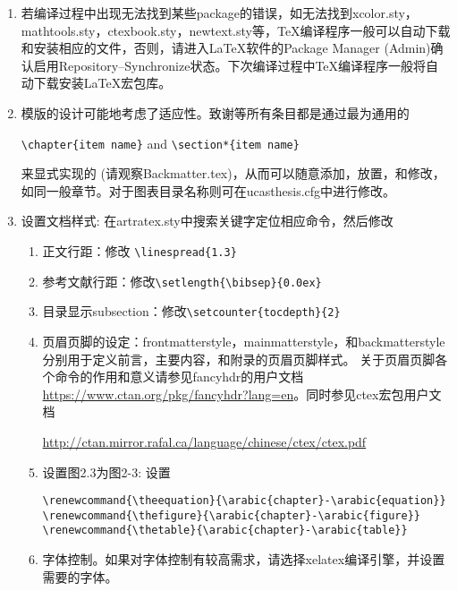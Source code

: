 \begin{enumerate}
    \item 若编译过程中出现无法找到某些package的错误，如无法找到xcolor.sty，mathtools.sty，ctexbook.sty，newtext.sty等，\TeX{}编译程序一般可以自动下载和安装相应的文件，否则，请进入\LaTeX{}软件的Package Manager (Admin)确认启用Repository--Synchronize状态。下次编译过程中\TeX{}编译程序一般将自动下载安装\LaTeX{}宏包库。
    \item 模版的设计可能地考虑了适应性。致谢等所有条目都是通过最为通用的

        \verb+\chapter{item name}+  and \verb+\section*{item name}+

        来显式实现的 (请观察Backmatter.tex)，从而可以随意添加，放置，和修改，如同一般章节。对于图表目录名称则可在ucasthesis.cfg中进行修改。

    \item 设置文档样式: 在artratex.sty中搜索关键字定位相应命令，然后修改
        \begin{enumerate}
            \item 正文行距：修改 \verb|\linespread{1.3}|
            \item 参考文献行距：修改\verb|\setlength{\bibsep}{0.0ex}|
            \item 目录显示subsection：修改\verb|\setcounter{tocdepth}{2}|
            \item 页眉页脚的设定：frontmatterstyle，mainmatterstyle，和backmatterstyle分别用于定义前言，主要内容，和附录的页眉页脚样式。                关于页眉页脚各个命令的作用和意义请参见fancyhdr的用户文档 \url{https://www.ctan.org/pkg/fancyhdr?lang=en}。同时参见ctex宏包用户文档
                
                \url{http://ctan.mirror.rafal.ca/language/chinese/ctex/ctex.pdf}

            \item 设置图2.3为图2-3: 设置
                {
                    \footnotesize
\begin{verbatim}
\renewcommand{\theequation}{\arabic{chapter}-\arabic{equation}}
\renewcommand{\thefigure}{\arabic{chapter}-\arabic{figure}}
\renewcommand{\thetable}{\arabic{chapter}-\arabic{table}}
\end{verbatim}
                }
             \item 字体控制。如果对字体控制有较高需求，请选择xelatex编译引擎，并设置需要的字体。
                 

\end{enumerate}
\end{enumerate}
